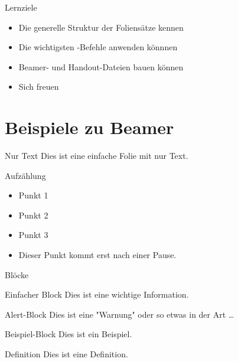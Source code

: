 \begin{frame}{Lernziele}
    \begin{itemize}
        \item Die generelle Struktur der Foliensätze kennen
        \item Die wichtigsten \latex-Befehle anwenden könnnen
        \item Beamer- und Handout-Dateien bauen können
        \item Sich freuen \smiley
    \end{itemize}
\end{frame}

\section{Beispiele zu \latex Beamer}

\begin{frame}{Nur Text}
    Dies ist eine einfache Folie mit nur Text.
\end{frame}

\begin{frame}{Aufzählung}
    \begin{itemize}
        \item Punkt 1
        \item Punkt 2
        \item Punkt 3

        \pause
        \item Dieser Punkt kommt erst nach einer Pause.
    \end{itemize}
\end{frame}

\begin{frame}{Blöcke}
    \begin{block}{Einfacher Block}
       Dies ist eine wichtige Information.
    \end{block}

    \begin{alertblock}{Alert-Block}
        Dies ist eine "Warnung" oder so etwas in der Art …
    \end{alertblock}

    \begin{exampleblock}{Beispiel-Block}
        Dies ist ein Beispiel.
    \end{exampleblock}

    \begin{definition}{Definition}
        Dies ist eine Definition.
    \end{definition}
\end{frame}

